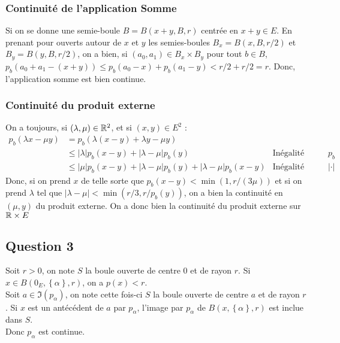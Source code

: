 \documentclass{cours}
\newcommand{\abs}[1]{\left|#1\right|}
\begin{document}
            \subsubsection{Continuité de l'application Somme}
                Si on se donne une semie-boule $B = B(x + y, B, r)$ centrée en $x + y \in E$. 
                En prenant pour ouverts autour de $x$ et $y$ les semies-boules $B_{x} = B(x, B, r/2)$ et $B_{y} = B(y, B, r/2)$, on a bien, si $(a_0, a_1) \in B_{x} \times B_{y}$ pour tout $b \in B$, $p_{b}(a_0 + a_1 - (x + y)) \leq p_{b}(a_0 - x) + p_{b}(a_1 - y) < r/2 + r/2 = r$. 
                Donc, l'application somme est bien continue.
            \subsubsection{Continuité du produit externe}
                On a toujours, si $(\lambda, \mu) \in \mathbb{R}^2$, et si $(x, y) \in E^2$ : 
                \[\begin{aligned} 
                    p_{b}(\lambda x - \mu y) &= p_{b}(\lambda (x-y) +\lambda y - \mu y) & \\
                    &\leq \left|\lambda\right| p_{b}(x - y) + \left|\lambda - \mu\right|p_{b}(y) &\text{Inégalité Triangulaire sur } p_{b}\\
                    &\leq \left|\mu\right| p_{b}(x - y) + \left|\lambda - \mu\right|p_{b}(y) + \left|\lambda - \mu\right|p_{b}(x - y) &\text{Inégalité Triangulaire sur }\left|\cdot\right|
                \end{aligned}\]
                Donc, si on prend $x$ de telle sorte que $p_{b}(x-y) < \min(1, r/(3\mu))$ et si on prend $\lambda$ tel que $\abs{\lambda - \mu} < \min(r/3, r/p_{b}(y))$, on a bien la continuité en $(\mu, y)$ du produit externe. On a donc bien la continuité du produit externe sur $\mathbb{R} \times E$

        \subsection{Question 3}
            Soit $r > 0$, on note $S$ la boule ouverte de centre $0$ et de rayon $r$. Si $x \in B(0_{E}, \left\{\alpha\right\}, r)$, on a $p(x) < r$.\\
            Soit $a \in \Im(p_{\alpha})$, on note cette fois-ci $S$ la boule ouverte de centre $a$ et de rayon $r$. Si $x$ est un antécédent de $a$ par $p_{\alpha}$, l'image par $p_{\alpha}$ de $B(x, \left\{\alpha\right\}, r)$ est inclue dans $S$.\\
            Donc $p_{\alpha}$ est continue.
\end{document}
